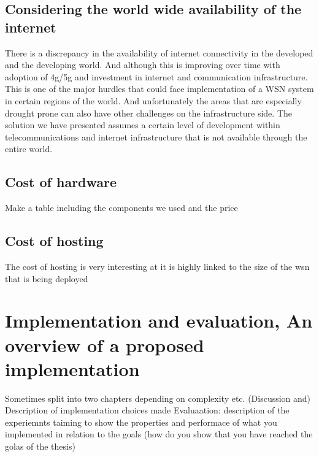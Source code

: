 \documentclass[]{uiophd}
\begin{document}
\section{Considering the world wide availability of the internet}
There is a discrepancy in the availability of internet connectivity in the developed and the developing world. And although this is improving over time with adoption of 4g/5g and investment in internet and communication infrastructure. This is one of the major hurdles that could face implementation of a WSN system in certain regions of the world. And unfortunately the areas that are especially drought prone can also have other challenges on the infrastructure side. The solution we have presented assumes a certain level of development within telecommunications and internet infrastructure that is not available through the entire world.
\section{Cost of hardware}
Make a table including the components we used and the price

\section{Cost of hosting}
The cost of hosting is very interesting at it is highly linked to the size of the wsn that is being deployed



\chapter{Implementation and evaluation, An overview of a proposed implementation}

Sometimes split into two chapters depending on complexity etc.
(Discussion and) Description of implementation choices made 
Evaluaation: description of the experiemnts taiming to show the properties 
and performace of what you implemented in relation to the goals (how do you show that you have reached the golas of the thesis)
\end{document}
